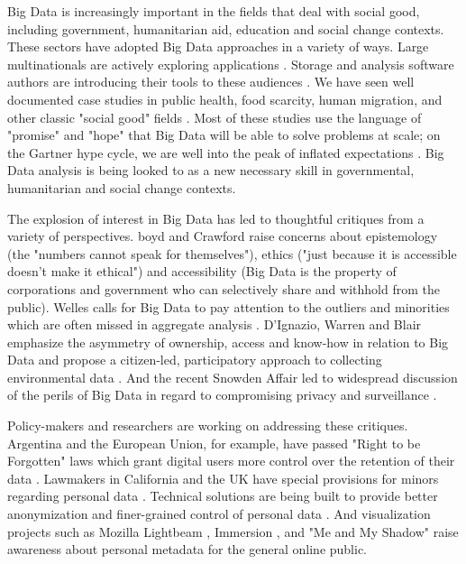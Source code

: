\documentclass{sig-alternate}
\begin{document}
Big Data is increasingly important in the fields that deal with social good, including government, humanitarian aid, education and social change contexts. These sectors have adopted Big Data approaches in a variety of ways. Large multinationals are actively exploring applications \cite{letouze_big_2012}.  Storage and analysis software authors are introducing their tools to these audiences \cite{fadiya_advancing_2014}.  We have seen well documented case studies in public health, food scarcity, human migration, and other classic "social good" fields \cite{world_bank_big_data_2014}.  Most of these studies use the language of "promise" and "hope" that Big Data will be able to solve problems at scale; on the Gartner hype cycle, we are well into the peak of inflated expectations \cite{wikipedia_hype_2015}. Big Data analysis is being looked to as a new necessary skill in governmental, humanitarian and social change contexts.

The explosion of interest in Big Data has led to thoughtful critiques from a variety of perspectives. boyd and Crawford \cite{boyd_critical_2012} raise concerns about epistemology (the "numbers cannot speak for themselves"), ethics ("just because it is accessible doesn't make it ethical") and accessibility (Big Data is the property of corporations and government who can selectively share and withhold from the public). Welles calls for Big Data to pay attention to the outliers and minorities which are often missed in aggregate analysis \cite{welles_minorities_2014}. D'Ignazio, Warren and Blair emphasize the asymmetry of ownership, access and know-how in relation to Big Data and propose a citizen-led, participatory approach to collecting environmental data \cite{dignazio_small_data_2014}. And the recent Snowden Affair \cite{wikipedia_edward_2015} led to widespread discussion of the perils of Big Data in regard to compromising privacy and surveillance \cite{guardian_nsa}. 

Policy-makers and researchers are working on addressing these critiques. Argentina and the European Union, for example, have passed "Right to be Forgotten" laws which grant digital users more control over the retention of their data \cite{wikipedia_forget_2015}. Lawmakers in California and the UK have special provisions for minors regarding personal data \cite{john_teenagers_2015}. Technical solutions are being built to provide better anonymization and finer-grained control of personal data \cite{de_montjoye_openpds_2014}. And visualization projects such as Mozilla Lightbeam \cite{mozilla_lightbeam}, Immersion \cite{jagdish_immersion_2014}, and "Me and My Shadow" \cite{tachtech_shadow} raise awareness about personal metadata for the general online public. 
\end{document}

